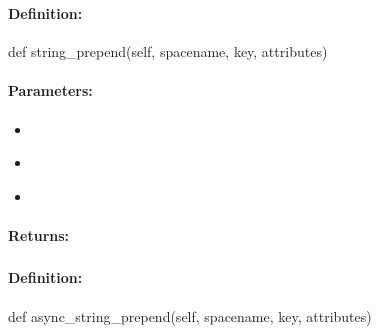 \subsubsection{}
\label{api:python:string_prepend}


\paragraph{Definition:}
\begin{pythoncode}
def string_prepend(self, spacename, key, attributes)
\end{pythoncode}

\paragraph{Parameters:}
\begin{itemize}[noitemsep]
\item {}\\

\item {}\\

\item {}\\

\end{itemize}

\paragraph{Returns:}


\pagebreak
\subsubsection{}
\label{api:python:async_string_prepend}


\paragraph{Definition:}
\begin{pythoncode}
def async_string_prepend(self, spacename, key, attributes)
\end{pythoncode}


